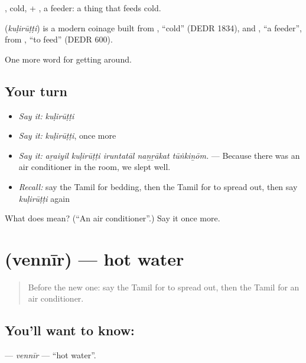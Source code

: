 , cold, + , a feeder: a thing that feeds cold.

\begin{cousinweb}
\textbf{} (\emph{kuḷirūṭṭi}) is a modern coinage built from , \textquotedblleft{}cold\textquotedblright{} (DEDR 1834), and , \textquotedblleft{}a feeder\textquotedblright{}, from , \textquotedblleft{}to feed\textquotedblright{} (DEDR 600).
\end{cousinweb}

\begin{grammarlens}[title={What you've built}]
One more word for getting around.
\end{grammarlens}

\subsection*{Your turn}
\begin{itemize}
\raggedright
  \item \emph{Say it:} \emph{kuḷirūṭṭi}
  \item \emph{Say it:} \emph{kuḷirūṭṭi}, once more
  \item \emph{Say it:} \emph{aṟaiyil kuḷirūṭṭi iruntatāl naṉṟākat tūṅkiṉōm.} — Because there was an air conditioner in the room, we slept well.
  \item \emph{Recall:} say the Tamil for bedding, then the Tamil for to spread out, then say \emph{kuḷirūṭṭi} again
\end{itemize}

\begin{tcolorbox}[breakable,colback=teal!4,colframe=teal!35!black,title={Before you move on}]
What does  mean? (\textquotedblleft{}An air conditioner\textquotedblright{}.) Say it once more.
\end{tcolorbox}
\section[\texorpdfstring{\ta{வெந்நீர்} (vennīr)}{வெந்நீர் (vennīr)}]{ (vennīr) — hot water}

\label{lesson:TA-C419-vennir}



\begin{quote}
Before the new one: say the Tamil for to spread out, then the Tamil for an air conditioner.
\end{quote}

\subsection*{You'll want to know: }
\textbf{} — \emph{vennīr} — \textquotedblleft{}hot water\textquotedblright{}.

